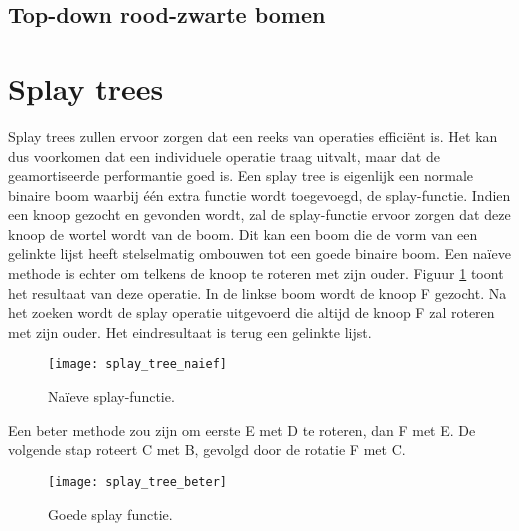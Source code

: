 \documentclass{report}
\begin{document}
	\subsection{Top-down rood-zwarte bomen}
	
	


	
	\section{Splay trees}
	Splay trees zullen ervoor zorgen dat een reeks van operaties efficiënt is. Het kan dus voorkomen dat een individuele operatie traag uitvalt, maar dat de geamortiseerde performantie goed is. Een splay tree is eigenlijk een normale binaire boom waarbij één extra functie wordt toegevoegd, de splay-functie. Indien een knoop gezocht en gevonden wordt, zal de splay-functie ervoor zorgen dat deze knoop de wortel wordt van de boom. Dit kan een boom die de vorm van een gelinkte lijst heeft stelselmatig ombouwen tot een goede binaire boom. Een naïeve methode is echter om telkens de knoop te roteren met zijn ouder. Figuur \ref{fig:splay_tree_naief} toont het resultaat van deze operatie. In de linkse boom wordt de knoop F gezocht. Na het zoeken wordt de splay operatie uitgevoerd die altijd de knoop F zal roteren met zijn ouder. Het eindresultaat is terug een gelinkte lijst.
	\begin{figure}[h]
		\centering
		\texttt{[image: splay\_tree\_naief]}
		\caption{Naïeve splay-functie.}
		\label{fig:splay_tree_naief}
	\end{figure}
	Een beter methode zou zijn om eerste E met D te roteren, dan F met E. De volgende stap roteert C met B, gevolgd door de rotatie F met C.
	\begin{figure}[h]
		\centering
		\texttt{[image: splay\_tree\_beter]}
		\caption{Goede splay functie.}
		\label{fig:splay_tree_beter}
	\end{figure}
\end{document}
